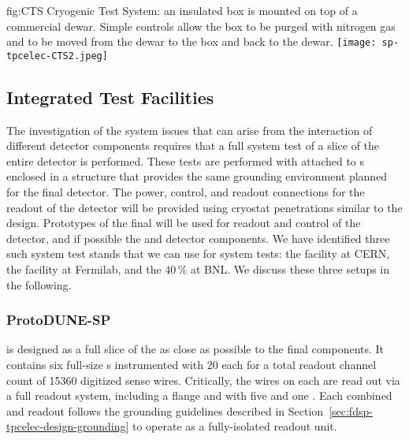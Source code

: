 \begin{dunefigure}
{fig:CTS}
{Cryogenic Test System: an insulated box is mounted on top of a commercial \lntwo dewar.  Simple controls allow the box to be purged with nitrogen gas and \lntwo to be moved from the dewar to the box and back to the dewar.}
\texttt{[image: sp-tpcelec-CTS2.jpeg]}
\end{dunefigure}


\subsection{Integrated Test Facilities}
\label{sec:fdsp-tpcelec-qa-facilities}

The investigation of the system issues that can arise from the interaction 
of different detector components requires that a full system test of a slice
of the entire detector is performed. These tests are performed with 
attached to s enclosed in a structure that provides the same
grounding environment planned for the final  detector. The
power, control, and readout connections for the readout of the detector
will be provided using cryostat penetrations similar to the 
design. Prototypes of the final  will be used for readout and
control of the detector, and if possible the  and 
detector components. We have identified three such system test stands
that we can use for system tests: the  facility at CERN, the
 facility at Fermilab, and the \num{40}\,\%  at BNL.
We discuss these three setups in the following.

\subsubsection{ProtoDUNE-SP}
\label{sec:fdsp-tpcelec-qa-facilities-pdune}

 is designed as a full slice of the  as close as 
possible to the final  components. It contains six full-size 
 s instrumented with \num{20}  each for a 
total readout channel count of \num{15360} digitized sense wires. Critically, 
the wires on each  are read out via a full  readout 
system, including a  flange and  with five  
and one . Each combined  and  readout follows 
the grounding guidelines described in Section~\ref{sec:fdsp-tpcelec-design-grounding} 
to operate as a fully-isolated readout unit.

